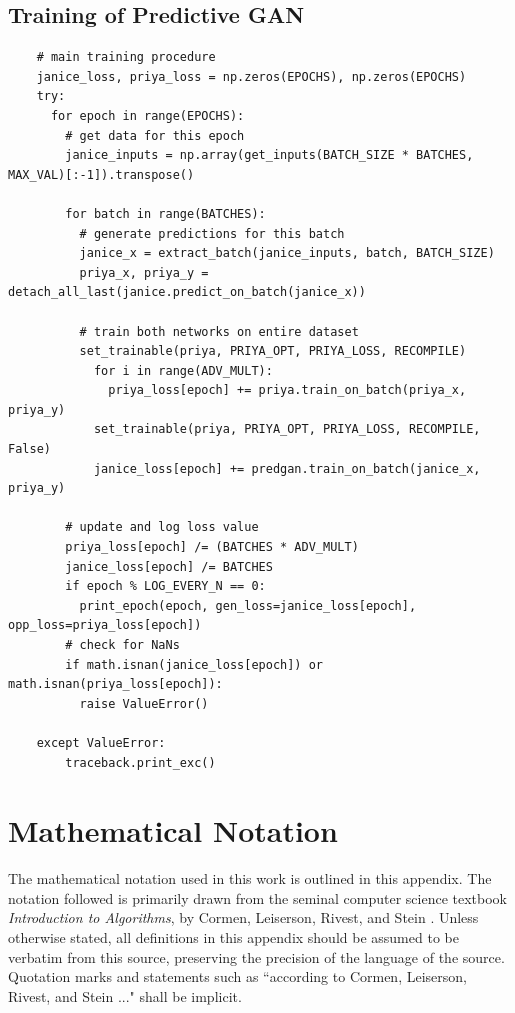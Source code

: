 \documentclass[12pt, titlepage]{report}
\theoremstyle{definition}
\begin{document}
\section{Training of Predictive GAN}\label{appendix:training_predgan}
\begin{verbatim}
    # main training procedure
    janice_loss, priya_loss = np.zeros(EPOCHS), np.zeros(EPOCHS)
    try:
      for epoch in range(EPOCHS):
        # get data for this epoch
        janice_inputs = np.array(get_inputs(BATCH_SIZE * BATCHES, MAX_VAL)[:-1]).transpose()

        for batch in range(BATCHES):
          # generate predictions for this batch
          janice_x = extract_batch(janice_inputs, batch, BATCH_SIZE)
          priya_x, priya_y = detach_all_last(janice.predict_on_batch(janice_x))

          # train both networks on entire dataset
          set_trainable(priya, PRIYA_OPT, PRIYA_LOSS, RECOMPILE)
            for i in range(ADV_MULT):
              priya_loss[epoch] += priya.train_on_batch(priya_x, priya_y)
            set_trainable(priya, PRIYA_OPT, PRIYA_LOSS, RECOMPILE, False)
            janice_loss[epoch] += predgan.train_on_batch(janice_x, priya_y)

        # update and log loss value
        priya_loss[epoch] /= (BATCHES * ADV_MULT)
        janice_loss[epoch] /= BATCHES
        if epoch % LOG_EVERY_N == 0:
          print_epoch(epoch, gen_loss=janice_loss[epoch], opp_loss=priya_loss[epoch])
        # check for NaNs
        if math.isnan(janice_loss[epoch]) or math.isnan(priya_loss[epoch]):
          raise ValueError()

    except ValueError:
        traceback.print_exc()
\end{verbatim}

\chapter{Mathematical Notation}\label{appendix:mathematics}
The mathematical notation used in this work is outlined in this appendix. The notation followed is primarily drawn from the seminal computer science textbook \textit{Introduction to Algorithms}, by Cormen, Leiserson, Rivest, and Stein \cite{cormen2009introduction}. Unless otherwise stated, all definitions in this appendix should be assumed to be verbatim from this source, preserving the precision of the language of the source. Quotation marks and statements such as ``according to Cormen, Leiserson, Rivest, and Stein ..." shall be implicit.
\end{document}
